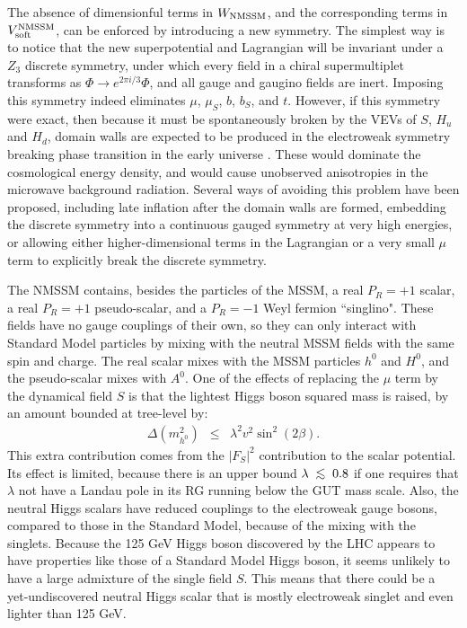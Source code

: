 \documentclass[11pt]{article}
\def\beq{\begin{eqnarray}}
\def\eeq{\end{eqnarray}}
\def\centeron#1#2{{\setbox0=\hbox{#1}\setbox1=\hbox{#2}\ifdim
\wd1>\wd0\kern.5\wd1\kern-.5\wd0\fi
\copy0\kern-.5\wd0\kern-.5\wd1\copy1\ifdim\wd0>\wd1
\kern.5\wd0\kern-.5\wd1\fi}}
\def\ltap{\;\centeron{\raise.35ex\hbox{$<$}}{\lower.65ex\hbox{$\sim$}}\;}
\def\lsim{\mathrel{\ltap}}
\begin{document}
The absence of dimensionful terms in $W_{\rm NMSSM}$, and the
corresponding terms in $V_{\rm soft}^{\rm NMSSM}$, can be enforced by
introducing a new symmetry. The simplest way is to notice that the new
superpotential and Lagrangian will be invariant under a $Z_3$ discrete
symmetry, under which every field in a chiral supermultiplet transforms as
$\Phi \rightarrow e^{2 \pi i/3} \Phi$, and all gauge and gaugino fields
are inert. Imposing this symmetry indeed eliminates $\mu$, $\mu_S$, $b$,
$b_S$, and $t$. However, if this symmetry were exact, then because it must
be spontaneously broken by the VEVs of $S$, $H_u$ and $H_d$, domain walls
are expected to be produced in the electroweak symmetry breaking phase
transition in the early universe \cite{NMSSMdomainwalls}. These would
dominate the cosmological energy density, and would cause unobserved
anisotropies in the microwave background radiation. Several ways of
avoiding this problem have been proposed, including late inflation after
the domain walls are formed, embedding the discrete symmetry into a
continuous gauged symmetry at very high energies, or allowing either
higher-dimensional terms in the Lagrangian or a very small $\mu$ term to
explicitly break the discrete symmetry. 

The NMSSM contains, besides the particles of the MSSM, a real $P_R=+1$ 
scalar, a real $P_R=+1$ pseudo-scalar, and a $P_R=-1$ Weyl fermion 
``singlino". These fields have no gauge couplings of their own, so they 
can only interact with Standard Model particles by mixing with the neutral 
MSSM fields with the same spin and charge. The real scalar mixes with the 
MSSM particles $h^0$ and $H^0$, and the pseudo-scalar mixes with $A^0$. 
One of the effects of replacing the $\mu$ term by the dynamical field $S$ 
is that the lightest Higgs boson squared mass is raised, by an amount bounded 
at tree-level by:
\beq
\Delta(m_{h^0}^2) &\leq& \lambda^2 v^2 \sin^2 (2 \beta).
\eeq
This extra contribution comes from the $|F_S|^2$ contribution to 
the scalar potential. Its effect is limited, because there is an upper bound 
$\lambda \lsim 0.8$ if one 
requires that $\lambda$ not have a Landau pole in its RG running below the 
GUT mass scale.  
Also, the neutral Higgs scalars have reduced couplings to the electroweak 
gauge bosons, compared to those in the Standard Model, because of the 
mixing with the singlets. Because the 125 GeV Higgs boson discovered by the LHC
appears to have properties like those of a Standard Model Higgs boson, it seems unlikely 
to have a large admixture of the single field $S$. This means that there could be
a yet-undiscovered neutral Higgs scalar that is mostly electroweak singlet and
even lighter than 125 GeV.
\end{document}
